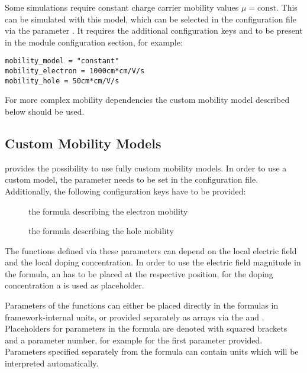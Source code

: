 Some simulations require constant charge carrier mobility values $\mu = \textrm{const}$.
This can be simulated with this model, which can be selected in the configuration file via the parameter .
It requires the additional configuration keys  and  to be present in the module configuration section, for example:

\begin{verbatim}
mobility_model = "constant"
mobility_electron = 1000cm*cm/V/s
mobility_hole = 50cm*cm/V/s
\end{verbatim}

For more complex mobility dependencies the custom mobility model described below should be used.

\subsection{Custom Mobility Models}
\apsq provides the possibility to use fully custom mobility models.
In order to use a custom model, the parameter  needs to be set in the configuration file.
Additionally, the following configuration keys have to be provided:
\begin{description}
    \item[] the formula describing the electron mobility
    \item[] the formula describing the hole mobility
\end{description}

The functions defined via these parameters can depend on the local electric field and the local doping concentration.
In order to use the electric field magnitude in the formula, an  has to be placed at the respective position, for the doping concentration a  is used as placeholder.

Parameters of the functions can either be placed directly in the formulas in framework-internal units, or provided separately as arrays via the  and .
Placeholders for parameters in the formula are denoted with squared brackets and a parameter number, for example \parameter{[0]} for the first parameter provided.
Parameters specified separately from the formula can contain units which will be interpreted automatically.

